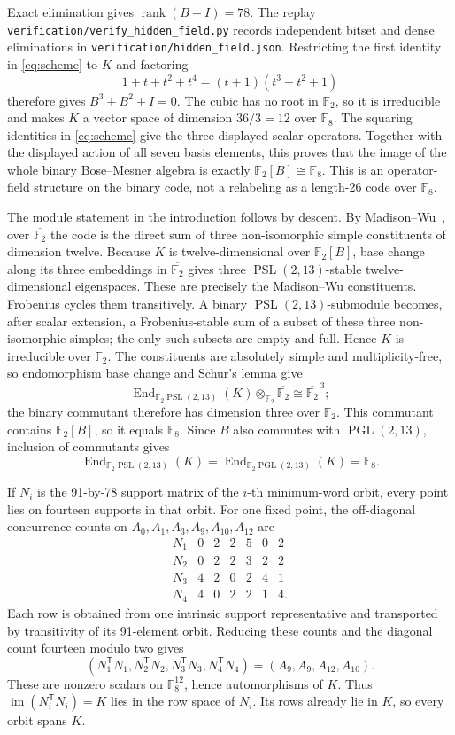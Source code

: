\documentclass[11pt]{article}
\theoremstyle{definition}
\theoremstyle{remark}
\newcommand{\F}{\mathbb F}
\begin{document}
Exact elimination gives \(\operatorname{rank}(B+I)=78\).  The replay
\nolinkurl{verification/verify_hidden_field.py} records independent bitset and
dense eliminations in \nolinkurl{verification/hidden_field.json}.  Restricting
the first identity in \eqref{eq:scheme} to \(K\) and factoring
\[
 1+t+t^2+t^4=(t+1)(t^3+t^2+1)
\]
therefore gives \(B^3+B^2+I=0\).  The cubic has no root in \(\F_2\), so it
is irreducible and makes \(K\) a vector space of dimension \(36/3=12\) over
\(\F_8\).  The squaring identities in \eqref{eq:scheme} give the three
displayed scalar operators.  Together with the displayed action of all seven
basis elements, this proves that the image of the whole binary Bose--Mesner
algebra is exactly \(\F_2[B]\cong\F_8\).  This is an operator-field structure
on the binary code, not a relabeling as a length-26 code over \(\F_8\).

The module statement in the introduction follows by descent.  By
Madison--Wu~\cite[Theorem~5.1(i)]{MadisonWu2012}, over
\(\overline{\F_2}\) the code is the direct sum of three non-isomorphic simple
constituents of dimension twelve.  Because \(K\) is twelve-dimensional over
\(\F_2[B]\), base change along its three embeddings in \(\overline{\F_2}\)
gives three \(\operatorname{PSL}(2,13)\)-stable twelve-dimensional
eigenspaces.  These are precisely the Madison--Wu constituents.
Frobenius cycles them transitively.  A binary
\(\operatorname{PSL}(2,13)\)-submodule becomes, after scalar extension, a
Frobenius-stable sum of a subset of these three non-isomorphic simples; the
only such subsets are empty and full.  Hence \(K\) is irreducible over
\(\F_2\).  The constituents are absolutely simple and multiplicity-free, so
endomorphism base change and Schur's lemma give
\[
 \operatorname{End}_{\F_2\operatorname{PSL}(2,13)}(K)
 \otimes_{\F_2}\overline{\F_2}\cong\overline{\F_2}^{\,3};
\]
the binary commutant therefore has dimension three over \(\F_2\).
This commutant contains \(\F_2[B]\), so it equals \(\F_8\).  Since \(B\)
also commutes with \(\operatorname{PGL}(2,13)\), inclusion of commutants gives
\[
 \operatorname{End}_{\F_2\operatorname{PSL}(2,13)}(K)
 =\operatorname{End}_{\F_2\operatorname{PGL}(2,13)}(K)=\F_8.
\]

If \(N_i\) is the 91-by-78 support matrix of the \(i\)-th minimum-word
orbit, every point lies on fourteen supports in that orbit.  For one fixed
point, the off-diagonal concurrence counts on
\(A_0,A_1,A_3,A_9,A_{10},A_{12}\) are
\[
\begin{array}{c|rrrrrr}
N_1&0&2&2&5&0&2\\
N_2&0&2&2&3&2&2\\
N_3&4&2&0&2&4&1\\
N_4&4&0&2&2&1&4.
\end{array}
\]
Each row is obtained from one intrinsic support representative and transported
by transitivity of its 91-element orbit.  Reducing these counts and the
diagonal count fourteen modulo two gives
\[
 (N_1^{\mathsf T}N_1,N_2^{\mathsf T}N_2,
   N_3^{\mathsf T}N_3,N_4^{\mathsf T}N_4)
 =(A_9,A_9,A_{12},A_{10}).
\]
These are nonzero scalars on \(\F_8^{12}\), hence automorphisms of \(K\).
Thus \(\operatorname{im}(N_i^{\mathsf T}N_i)=K\) lies in the row space of
\(N_i\).  Its rows already lie in \(K\), so every orbit spans \(K\).
\end{document}

